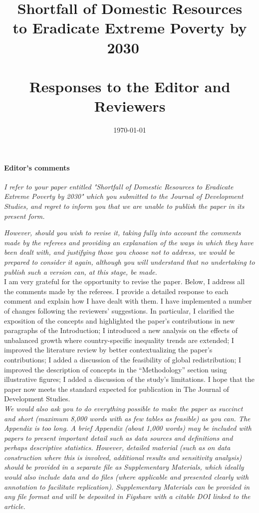 \documentclass[12pt,english]{article}
\title{Shortfall of Domestic Resources\\to Eradicate Extreme Poverty by 2030 ~\\ ~\\ \textbf{Responses to the Editor and Reviewers}}
\date{\today}
\begin{document}
	
\maketitle

\paragraph*{Editor's comments}

\textit{I refer to your paper entitled  "Shortfall of Domestic Resources to Eradicate Extreme Poverty by 2030" which you submitted to the Journal of Development Studies, and regret to inform you that we are unable to publish the paper in its present form.}

\textit{However, should you wish to revise it, taking fully into account the comments made by the referees and providing an explanation of the ways in which they have been dealt with, and justifying those you choose not to address, we would be prepared to consider it again, although you will understand that no undertaking to publish such a version can, at this stage, be made.}~\\

I am very grateful for the opportunity to revise the paper. Below, I address all the comments made by the referees. I provide a detailed response to each comment and explain how I have dealt with them. I have implemented a number of changes following the reviewers' suggestions. In particular, I clarified the exposition of the concepts and highlighted the paper's contributions in new paragraphs of the Introduction; I introduced a new analysis on the effects of unbalanced growth where country-specific inequality trends are extended; I improved the literature review by better contextualizing the paper's contributions; I added a discussion of the feasibility of global redistribution; I improved the description of concepts in the ``Methodology'' section using illustrative figures; I added a discussion of the study's limitations. I hope that the paper now meets the standard expected for publication in The Journal of Development Studies. ~\\

\textit{We would also ask you to do everything possible to make the paper as succinct and short (maximum 8,000 words with as few tables as feasible) as you can. The Appendix is too long.  A brief Appendix (about 1,000 words) may be included with papers to present important detail such as data sources and definitions and perhaps descriptive statistics. 
However, detailed material (such as on data construction where this is involved, additional results and sensitivity analysis) should be provided in a separate file as Supplementary Materials, which ideally would also include data and do files (where applicable and presented clearly with annotation to facilitate replication). Supplementary Materials can be provided in any file format and will be deposited in Figshare with a citable DOI linked to the article.}~\\
\end{document}
